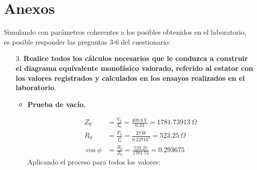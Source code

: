 \documentclass[a4paper,12pt]{article}
\newcommand{\mrm}{\mathrm}
\begin{document}
\section*{Anexos}
Simulando con parámetros coherentes a los posibles obtenidos en el laboratorio, es posible responder las preguntas 3-6 del cuestionario:
\begin{enumerate}
    \item[3.] \textbf{Realice todos los cálculos necesarios que le conduzca a construir el diagrama equivalente monofásico valorado, referido al estator con los valores registrados y calculados en los ensayos realizados en el laboratorio}.
    \begin{itemize}
        \item \textbf{Prueba de vacío.}
        \begin{table}[H]
            \centering
            \caption{Datos obtenidos en la prueba de vacío}
        \end{table}
        \begin{align*}
            Z_{0} &= \frac{V_{0}}{I_{0}} = \frac{409.8\,\mrm{V}}{0.23} = 1781.73913\,\Omega\\
            R_{0} &= \frac{P_{0}}{I^{2}_{0}} = \frac{27\,\mrm{W}}{0.22716^{2}} = 523.25\,\Omega\\
            \cos\phi &= \frac{R_{0}}{Z_{0}} = \frac{523.25}{1781.73} = 0.293675
        \end{align*}
        Aplicando el proceso para todos los valores:
        \begin{table}[H]
            \centering
            \tcbox[left=0mm,right=0mm,top=0mm,bottom=0mm,boxsep=0mm,toptitle=0.8mm,bottomtitle=0.8mm,title=Prueba de vacío]{
}
\end{table}
\end{itemize}
\end{enumerate}
\end{document}

